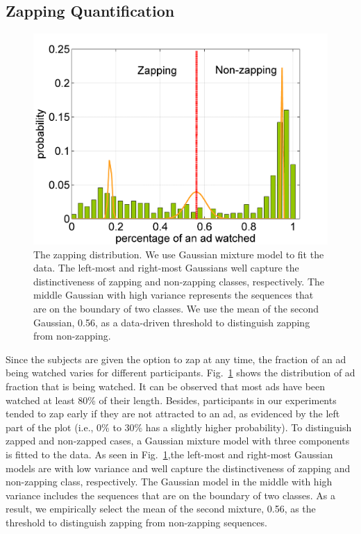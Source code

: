 \documentclass[10pt,journal,cspaper,compsoc]{IEEEtran}
\begin{document}

\subsection{Zapping Quantification}

\begin{figure}[h]
	\centering
		\includegraphics[width=.85\columnwidth]{fig/ad_len_distr.png}
	\caption{The zapping distribution. We use Gaussian mixture model to fit the data.  The left-most and right-most Gaussians well capture the distinctiveness of zapping and non-zapping classes, respectively. The middle Gaussian with high variance represents the sequences that are on the boundary of two classes. We use the mean of the second Gaussian, 0.56, as a data-driven threshold to distinguish zapping from non-zapping.}
	\label{fig:ad_len_distr}
\end{figure}

Since the subjects are given the option to zap at any time, the fraction of an ad being watched varies for different participants. Fig.~\ref{fig:ad_len_distr} shows the distribution of ad fraction that is being watched. It can be observed that most ads have been watched at least 80\% of their length. Besides, participants in our experiments tended to zap early if they are not attracted to an ad, as evidenced by the left part of the plot (i.e., 0\% to 30\% has a slightly higher probability). To distinguish zapped and non-zapped cases, a Gaussian mixture model with three components is fitted to the data. As seen in Fig.~\ref{fig:ad_len_distr},the left-most and right-most Gaussian models are with low variance and well capture the distinctiveness of zapping and non-zapping class, respectively. The Gaussian model in the middle with high variance includes the sequences that are on the boundary of two classes. As a result, we empirically select the mean of the second mixture, 0.56, as the threshold to distinguish zapping from non-zapping sequences.
\end{document}

